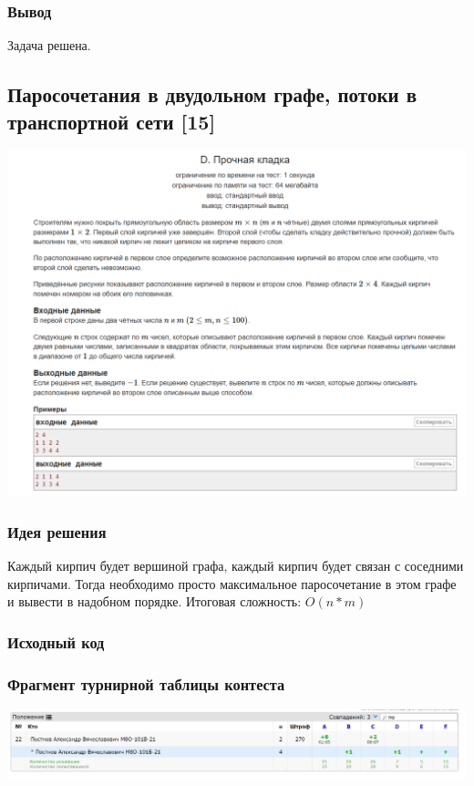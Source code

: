 \subsubsection*{Вывод}
Задача решена.

\vspace{20pt}

\pagebreak

\subsection*{Паросочетания в двудольном графе, потоки в транспортной сети [15]}
\begin{center}
\includegraphics[width=\textwidth]{statements/17.png}
\end{center}
\subsubsection*{Идея решения}
Каждый кирпич будет вершиной графа, каждый кирпич будет связан с соседними кирпичами. Тогда необходимо просто максимальное паросочетание в этом графе и вывести в надобном порядке.
Итоговая сложность: $O(n*m)$
\subsubsection*{Исходный код}


\subsubsection*{Фрагмент турнирной таблицы контеста}
\begin{center}
\includegraphics[width=\textwidth]{standings/17.png}\newline\noindent
\end{center}

